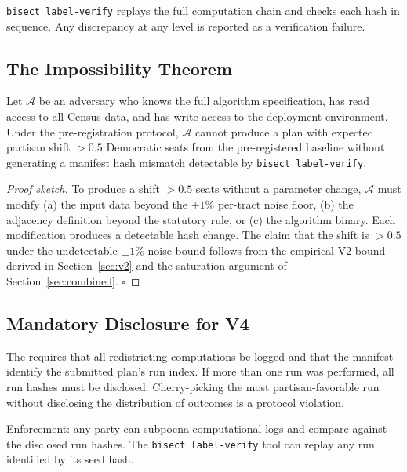 \texttt{bisect label-verify} replays the full computation chain and checks
each hash in sequence.
Any discrepancy at any level is reported as a verification failure.

\subsection{The Impossibility Theorem}

\begin{theorem}
\label{thm:gaming-impossibility}
Let $\mathcal{A}$ be an adversary who knows the full \bisect{} algorithm
specification, has read access to all Census data, and has write access
to the deployment environment.
Under the \dia{} pre-registration protocol, $\mathcal{A}$ cannot produce a
plan with expected partisan shift $> 0.5$ Democratic seats from the
pre-registered baseline without generating a manifest hash mismatch
detectable by \texttt{bisect label-verify}.
\end{theorem}

\begin{proof}[Proof sketch]
To produce a shift $> 0.5$ seats without a parameter change, $\mathcal{A}$
must modify (a) the input data beyond the $\pm 1\%$ per-tract noise floor,
(b) the adjacency definition beyond the statutory rule, or (c) the algorithm
binary.
Each modification produces a detectable hash change.
The claim that the shift is $> 0.5$ under the undetectable $\pm 1\%$ noise
bound follows from the empirical V2 bound derived in Section~\ref{sec:v2}
and the saturation argument of Section~\ref{sec:combined}.
$\square$
\end{proof}

\subsection{Mandatory Disclosure for V4}

The \dia{} requires that all redistricting computations be logged and
that the manifest identify the submitted plan's run index.
If more than one run was performed, all run hashes must be disclosed.
Cherry-picking the most partisan-favorable run without disclosing
the distribution of outcomes is a protocol violation.

Enforcement: any party can subpoena computational logs and compare
against the disclosed run hashes.
The \texttt{bisect label-verify} tool can replay any run identified
by its seed hash.
